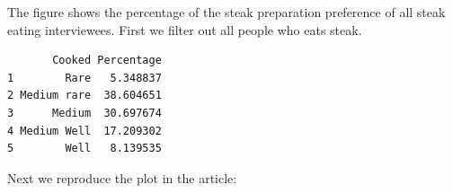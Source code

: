 \documentclass[
  letterpaper,
  DIV=11,
  numbers=noendperiod]{scrartcl}
\newenvironment{Shaded}{\begin{snugshade}}{\end{snugshade}}
\newcommand{\CommentTok}[1]{\textcolor[rgb]{0.37,0.37,0.37}{#1}}
\newcommand{\DecValTok}[1]{\textcolor[rgb]{0.68,0.00,0.00}{#1}}
\newcommand{\FloatTok}[1]{\textcolor[rgb]{0.68,0.00,0.00}{#1}}
\newcommand{\FunctionTok}[1]{\textcolor[rgb]{0.28,0.35,0.67}{#1}}
\newcommand{\NormalTok}[1]{\textcolor[rgb]{0.00,0.23,0.31}{#1}}
\newcommand{\OtherTok}[1]{\textcolor[rgb]{0.00,0.23,0.31}{#1}}
\newcommand{\SpecialCharTok}[1]{\textcolor[rgb]{0.37,0.37,0.37}{#1}}
\newcommand{\StringTok}[1]{\textcolor[rgb]{0.13,0.47,0.30}{#1}}
\begin{document}
The figure shows the percentage of the steak preparation preference of
all steak eating interviewees. First we filter out all people who eats
steak.

\begin{Shaded}
\end{Shaded}

\begin{verbatim}
       Cooked Percentage
1        Rare   5.348837
2 Medium rare  38.604651
3      Medium  30.697674
4 Medium Well  17.209302
5        Well   8.139535
\end{verbatim}

Next we reproduce the plot in the article:
\end{document}
